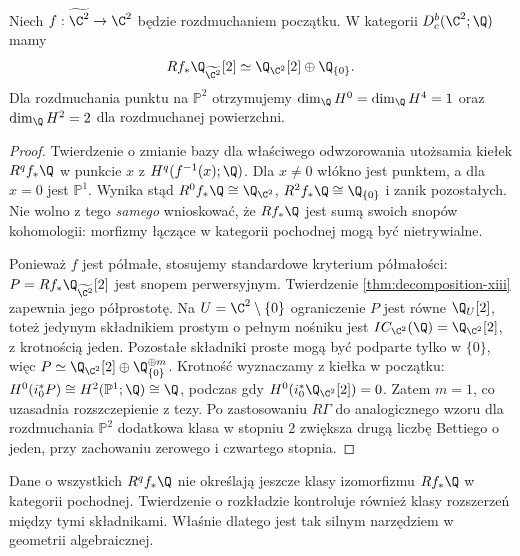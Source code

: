 \begin{stwierdzenie}
\label{prop:blowup-decomp-xiii}
Niech $f:\widetilde{\C^2}\to\C^2$ będzie rozdmuchaniem
początku. W kategorii $D_c^b(\C^2;\Q)$ mamy
\[
Rf_*\Q_{\widetilde{\C^2}}[2]
\simeq\Q_{\C^2}[2]\oplus\Q_{\{0\}}.
\]
Dla rozdmuchania punktu na $\mathbb P^2$ otrzymujemy
$\dim_\Q H^0=\dim_\Q H^4=1$ oraz
$\dim_\Q H^2=2$ dla rozdmuchanej powierzchni.
\end{stwierdzenie}
\begin{proof}
Twierdzenie o zmianie bazy dla właściwego odwzorowania
utożsamia kiełek $R^qf_*\Q$ w punkcie $x$
z $H^q(f^{-1}(x);\Q)$. Dla $x\ne0$ włókno jest
punktem, a dla $x=0$ jest $\mathbb P^1$.
Wynika stąd $R^0f_*\Q\cong\Q_{\C^2}$,
$R^2f_*\Q\cong\Q_{\{0\}}$ i zanik pozostałych.
Nie wolno z tego \emph{samego} wnioskować, że
$Rf_*\Q$ jest sumą swoich snopów kohomologii:
morfizmy łączące w kategorii pochodnej mogą
być nietrywialne.

Ponieważ $f$ jest półmałe, stosujemy standardowe
kryterium półmałości: $P=Rf_*\Q_{\widetilde{\C^2}}[2]$
jest snopem perwersyjnym. Twierdzenie
\ref{thm:decomposition-xiii} zapewnia jego półprostotę.
Na $U=\C^2\setminus\{0\}$ ograniczenie $P$ jest
równe $\Q_U[2]$, toteż jedynym składnikiem
prostym o pełnym nośniku jest
$IC_{\C^2}(\Q)=\Q_{\C^2}[2]$,
z krotnością jeden. Pozostałe składniki proste
mogą być podparte tylko w $\{0\}$, więc
$P\simeq\Q_{\C^2}[2]\oplus\Q_{\{0\}}^{\oplus m}$.
Krotność wyznaczamy z kiełka w początku:
$H^0(i_0^*P)\cong H^2(\mathbb P^1;\Q)\cong\Q$,
podczas gdy $H^0(i_0^*\Q_{\C^2}[2])=0$.
Zatem $m=1$, co uzasadnia rozszczepienie z tezy.
Po zastosowaniu $R\Gamma$ do analogicznego wzoru
dla rozdmuchania $\mathbb P^2$ dodatkowa klasa
w stopniu $2$ zwiększa drugą liczbę Bettiego o jeden,
przy zachowaniu zerowego i czwartego stopnia.
\end{proof}
\begin{uwaga}
Dane o wszystkich $R^qf_*\Q$ nie określają
jeszcze klasy izomorfizmu $Rf_*\Q$ w kategorii
pochodnej. Twierdzenie o rozkładzie kontroluje
również klasy rozszerzeń między tymi składnikami.
Właśnie dlatego jest tak silnym narzędziem
w geometrii algebraicznej.
\end{uwaga}

